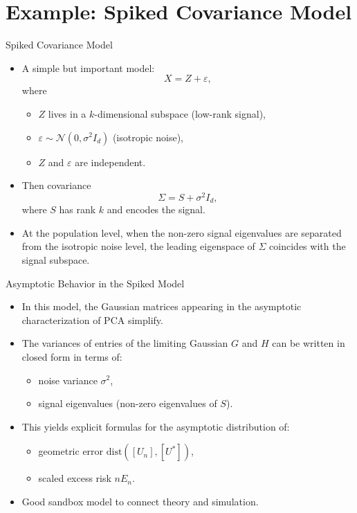 \documentclass{beamer}
\newcommand{\1}{\mathbbm{1}}
\begin{document}
\section{Example: Spiked Covariance Model}

\begin{frame}{Spiked Covariance Model} %
  \begin{itemize}
    \item A simple but important model:
    \[
      X = Z + \varepsilon,
    \]
    where
    \begin{itemize}
      \item $Z$ lives in a $k$-dimensional subspace (low-rank signal),
      \item $\varepsilon \sim \mathcal{N}(0, \sigma^2 I_d)$ (isotropic noise),
      \item $Z$ and $\varepsilon$ are independent.
    \end{itemize}
    \item Then covariance
    \[
      \Sigma = S + \sigma^2 I_d,
    \]
    where $S$ has rank $k$ and encodes the signal.
    \item At the population level, when the non-zero signal eigenvalues are separated from the isotropic noise level, the leading eigenspace of $\Sigma$ coincides with the signal subspace.
  \end{itemize}
\end{frame}

\begin{frame}{Asymptotic Behavior in the Spiked Model} %
  \begin{itemize}
    \item In this model, the Gaussian matrices appearing in the asymptotic
    characterization of PCA simplify.
    \item The variances of entries of the limiting Gaussian $G$ and $H$ can be written
    in closed form in terms of:
    \begin{itemize}
      \item noise variance $\sigma^2$,
      \item signal eigenvalues (non-zero eigenvalues of $S$).
    \end{itemize}
    \item This yields explicit formulas for the asymptotic
    distribution of:
    \begin{itemize}
      \item geometric error $\mathrm{dist}([U_n],[U^\ast])$,
      \item scaled excess risk $n E_n$.
    \end{itemize}
    \item Good sandbox model to connect theory and simulation.
  \end{itemize}
\end{frame}
\end{document}
